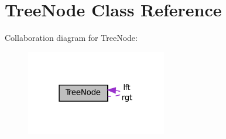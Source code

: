 \hypertarget{classTreeNode}{
\section{TreeNode Class Reference}
\label{classTreeNode}
}


Collaboration diagram for TreeNode:\nopagebreak
\begin{figure}[H]
\begin{center}
\leavevmode
\includegraphics[width=174pt]{classTreeNode__coll__graph}
\end{center}
\end{figure}
